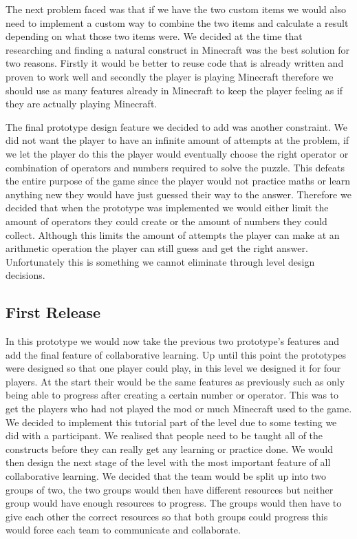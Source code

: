 The next problem faced was that if we have the two custom items we would also need to implement a custom way to combine the two items and calculate a result depending on what those two items were. We decided at the time that researching and finding a natural construct in Minecraft was the best solution for two reasons. Firstly it would be better to reuse code that is already written and proven to work well and secondly the player is playing Minecraft therefore we should use as many features already in Minecraft to keep the player feeling as if they are actually playing Minecraft.

The final prototype design feature we decided to add was another constraint. We did not want the player to have an infinite amount of attempts at the problem, if we let the player do this the player would eventually choose the right operator or combination of operators and numbers required to solve the puzzle. This defeats the entire purpose of the game since the player would not practice maths or learn anything new they would have just guessed their way to the answer. Therefore we decided that when the prototype was implemented we would either limit the amount of operators they could create or the amount of numbers they could collect. Although this limits the amount of attempts the player can make at an arithmetic operation the player can still guess and get the right answer. Unfortunately this is something we cannot eliminate through level design decisions.

\subsection{First Release}
In this prototype we would now take the previous two prototype's features and add the final feature of collaborative learning. Up until this point the prototypes were designed so that one player could play, in this level we designed it for four players. At the start their would be the same features as previously such as only being able to progress after creating a certain number or operator. This was to get the players who had not played the mod or much Minecraft used to the game. We decided to implement this tutorial part of the level due to some testing we did with a participant. We realised that people need to be taught all of the constructs before they can really get any learning or practice done. We would then design the next stage of the level with the most important feature of all collaborative learning. We decided that the team would be split up into two groups of two, the two groups would then have different resources but neither group would have enough resources to progress. The groups would then have to give each other the correct resources so that both groups could progress this would force each team to communicate and collaborate.

